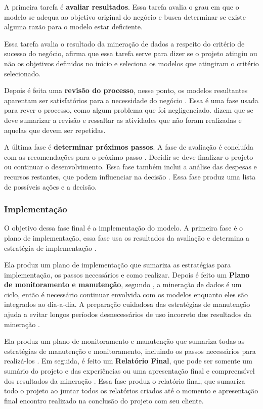 A primeira tarefa é \textbf{avaliar resultados}. Essa tarefa avalia o grau em que o modelo se adequa ao objetivo original do negócio e busca determinar se existe alguma razão para o modelo estar deficiente.

Essa tarefa avalia o resultado da mineração de dados a respeito do critério de sucesso do negócio,  afirma que essa tarefa serve para dizer se o projeto atingiu ou não os objetivos definidos no início e seleciona os modelos que atingiram o critério selecionado.

Depois é feita uma \textbf{revisão do processo}, nesse ponto, os modelos resultantes aparentam ser satisfatórios para a necessidade do negócio \citep{crispmanual}. Essa é uma fase usada para rever o processo, como algum problema que foi negligenciado.  dizem que se deve sumarizar a revisão e ressaltar as atividades que não foram realizadas e aquelas que devem ser repetidas.

A última fase é \textbf{determinar próximos passos}. A fase de avaliação é concluída com as recomendações para o próximo passo \citep{dmfd}. Decidir se deve finalizar o projeto ou continuar o desenvolvimento. Essa fase também inclui a análise das despesas e recursos restantes, que podem influenciar na decisão \citep{crispmanual}.
Essa fase produz uma lista de possíveis ações e a decisão.

\subsubsection{Implementação}
O objetivo dessa fase final é a implementação do modelo.
A primeira fase é o plano de implementação, essa fase usa os resultados da avaliação e determina a estratégia de implementação \citep{crispmanual}. 

Ela produz um plano de implementação que sumariza as estratégias para implementação, os passos necessários e como realizar.
Depois é feito um \textbf{Plano de monitoramento e manutenção}, segundo , a mineração de dados é um ciclo, então é necessário continuar envolvida com os modelos enquanto eles são integrados ao dia-a-dia. A preparação cuidadosa das estratégias de manutenção ajuda a evitar longos períodos desnecessários de uso incorreto dos resultados da mineração \citep{crispmanual}.

Ela produz um plano de monitoramento e manutenção que sumariza todas as estratégias de manutenção e monitoramento, incluindo os passos necessários para realizá-los \citep{crispmanual}.
Em seguida, é feito um \textbf{Relatório Final}, que pode ser somente um sumário do projeto e das experiências ou uma apresentação final e compreensível dos resultados da mineração \citep{crispmanual}.
Essa fase produz o relatório final, que sumariza todo o projeto ao juntar todos os relatórios criados até o momento \citep{dmfd} e apresentação final encontro realizado na conclusão do projeto com seu cliente.


